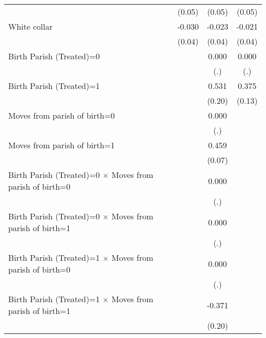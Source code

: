 {\begin{tabular}{l*{3}{c}}
                    &      (0.05)         &      (0.05)         &      (0.05)         \\
White collar        &      -0.030         &      -0.023         &      -0.021         \\
                    &      (0.04)         &      (0.04)         &      (0.04)         \\
Birth Parish (Treated)=0&                     &       0.000         &       0.000         \\
                    &                     &         (.)         &         (.)         \\
Birth Parish (Treated)=1&                     &       0.531\sym{**} &       0.375\sym{**} \\
                    &                     &      (0.20)         &      (0.13)         \\
Moves from parish of birth=0&                     &       0.000         &                     \\
                    &                     &         (.)         &                     \\
Moves from parish of birth=1&                     &       0.459\sym{***}&                     \\
                    &                     &      (0.07)         &                     \\
Birth Parish (Treated)=0 $\times$ Moves from parish of birth=0&                     &       0.000         &                     \\
                    &                     &         (.)         &                     \\
Birth Parish (Treated)=0 $\times$ Moves from parish of birth=1&                     &       0.000         &                     \\
                    &                     &         (.)         &                     \\
Birth Parish (Treated)=1 $\times$ Moves from parish of birth=0&                     &       0.000         &                     \\
                    &                     &         (.)         &                     \\
Birth Parish (Treated)=1 $\times$ Moves from parish of birth=1&                     &      -0.371         &                     \\
                    &                     &      (0.20)         &                     \\

\end{tabular}}
